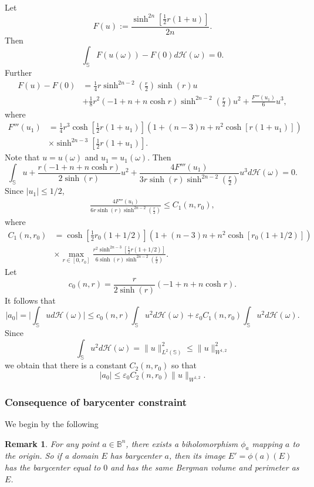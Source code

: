 \documentclass[11pt]{amsart}
\newtheorem{remark}[theorem]{Remark}
\numberwithin{equation}{section}
\newcommand{\abs}[1]{\lvert#1\rvert}
\begin{document}
Let $$F(u):=\frac{\sinh^{2n}\left[\frac{1}{2} r (1+u)\right]}{2n}.$$
Then $$\int_{\mathbb{S}} F(u(\omega))-F(0)d\mathcal{H}(\omega)=0.$$
Further
\[\begin{split}
F(u) - F(0) &= \frac{1}{4} r \sinh^{2n-2} (\frac{r}{2})\sinh(r)  u\\&+\frac{1}{8} r^2 (-1+n+n \cosh r) \sinh^{2n-2}(\frac{r}{2}) u^2+\frac{F'''(u_1)}{6} u^3,
\end{split}\]
where \[\begin{split}F'''(u_1)&=\frac{1}{4} r^3 \cosh\left[\frac{1}{2} r (1+u_1)\right] \left(1+(n-3) n+n^2 \cosh[r (1+u_1)]\right)\\&\times \sinh^{2n-3}\left[\frac{1}{2} r (1+u_1)\right].\end{split}\]
Note that $u=u(\omega)$ and $u_1=u_1(\omega)$. Then   $$\int_{\mathbb{S}}     u+\frac{r(-1+n+n \cosh r)}{2 \sinh(r)}  u^2+\frac{4F'''(u_1)}{3r \sinh(r)\sinh^{2n-2} (\frac{r}{2})} u^3d\mathcal{H}(\omega)=0.$$
Since  $|u_1|\le 1/2$, \[\begin{split} \frac{4F'''(u_1)}{6r \sinh(r)\sinh^{2n-2} (\frac{r}{2})}\le  C_1(n, r_0), \end{split}\]
where
\[\begin{split}C_1(n,r_0)&=\cosh\left[\frac{1}{2} r_0 (1+1/2)\right] \left(1+(n-3) n+n^2 \cosh[r_0 (1+1/2)]\right)\\&\times \max_{r\in[0,r_0]}\frac{r^2  \sinh^{2n-3}\left[\frac{1}{2} r (1+1/2)\right]}{{6 \sinh(r)\sinh^{2n-2} (\frac{r}{2})} }.\end{split}\]
Let $$c_0(n,r)=\frac{r}{2 \sinh(r)}  (-1+n+n \cosh r).$$
It follows that \begin{equation}\label{estU}|a_0|=\abs{\int_{\mathbb{S}}     u d\mathcal{H}(\omega)}\le c_0(n,r)\int_{\mathbb{S}} u^2 d\mathcal{H}(\omega)+ \varepsilon_0  C_1(n,r_0)\int_{\mathbb{S}} u^2 d\mathcal{H}(\omega).\end{equation}
Since $$\int_{\mathbb{S}} u^2 d\mathcal{H}(\omega)= \|u\|_{L^2(\mathbb{S})}^2\le \|u\|_{W^{1,2}}^2$$ we obtain that there is a constant $C_2(n,r_0)$ so that
\begin{equation}\label{rur}|a_0|\le \varepsilon_0 C_2(n,r_0)\|u\|_{W^{1,2}}.\end{equation}
\subsubsection{Consequence of barycenter constraint} We begin by the following \begin{remark}
For any point $a \in \mathbb{B}^n$, there exists a biholomorphism $\phi_a$ mapping $a$ to the origin. So if a domain $E$ has barycenter $a$, then its image $E'=\phi(a)(E)$ has the barycenter  equal to $0$ and has the same Bergman volume and perimeter as $E$.

\end{remark}
\end{document}

